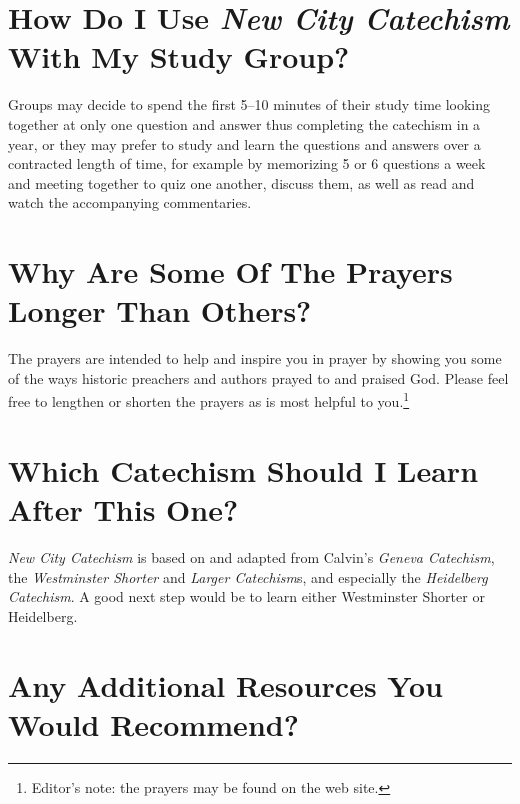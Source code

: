 \section[How Do I Use {\em New City Catechism}\/ With My Study Group?][Catechism With Study Group]{How Do I Use {\em New City Catechism}\/ With My Study Group?}

Groups may decide to spend the first 5--10 minutes of their study time looking together at only one question and answer thus completing the catechism in a year, or they may prefer to study and learn the questions and answers over a contracted length of time, for example by memorizing 5 or 6 questions a week and meeting together to quiz one another, discuss them, as well as read and watch the accompanying commentaries.

\section[Why Are Some Of The Prayers Longer Than Others?][Why Are Some Prayers Longer?]{Why Are Some Of The Prayers Longer Than Others?}

The prayers are intended to help and inspire you in prayer by showing you some of the ways historic preachers and authors prayed to and praised God. Please feel free to lengthen or shorten the prayers as is most helpful to you.\footnote{Editor's note: the prayers may be found on the web site.}

\section[Which Catechism Should I Learn After This One?][Next Catechism?]{Which Catechism Should I Learn After This One?}

\emph{New City Catechism}\/ is based on and adapted from Calvin's {\em Geneva Catechism}, the {\em Westminster Shorter}\/ and {\em Larger Catechism}s, and especially the {\em Heidelberg Catechism}. A good next step would be to learn either Westminster Shorter or Heidelberg.

\section[Any Additional Resources You Would Recommend?][Additional Resources?]{Any Additional Resources You Would Recommend?}


